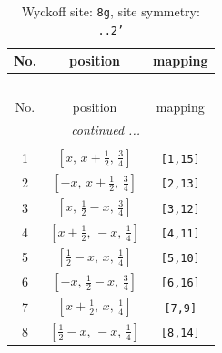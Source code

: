 \documentclass[fleqn,8pt]{jsarticle}
\begin{document}
\renewcommand{\arraystretch}{1.2}
\begin{longtable}{ccc}
\caption{Wyckoff site: {\tt 8g}, site symmetry: {\tt ..2'}}
 \\
 \hline \hline
No. & position & mapping \\ \hline \endfirsthead

\multicolumn{2}{l}{\tablename\ \thetable{}} \\
 \hline \hline
No. & position & mapping \\ \hline \endhead

 \hline \hline
\multicolumn{2}{r}{\footnotesize\it continued ...} \\ \endfoot

 \hline \hline
\multicolumn{2}{r}{} \\ \endlastfoot

1 & $\left[ x,\, x + \frac{1}{2},\, \frac{3}{4} \right]$ & {\tt [1,15]} \\ \hline
2 & $\left[ - x,\, x + \frac{1}{2},\, \frac{3}{4} \right]$ & {\tt [2,13]} \\ \hline
3 & $\left[ x,\, \frac{1}{2} - x,\, \frac{3}{4} \right]$ & {\tt [3,12]} \\ \hline
4 & $\left[ x + \frac{1}{2},\, - x,\, \frac{1}{4} \right]$ & {\tt [4,11]} \\ \hline
5 & $\left[ \frac{1}{2} - x,\, x,\, \frac{1}{4} \right]$ & {\tt [5,10]} \\ \hline
6 & $\left[ - x,\, \frac{1}{2} - x,\, \frac{3}{4} \right]$ & {\tt [6,16]} \\ \hline
7 & $\left[ x + \frac{1}{2},\, x,\, \frac{1}{4} \right]$ & {\tt [7,9]} \\ \hline
8 & $\left[ \frac{1}{2} - x,\, - x,\, \frac{1}{4} \right]$ & {\tt [8,14]} \\
\end{longtable}
\renewcommand{\arraystretch}{1.2}
\end{document}
